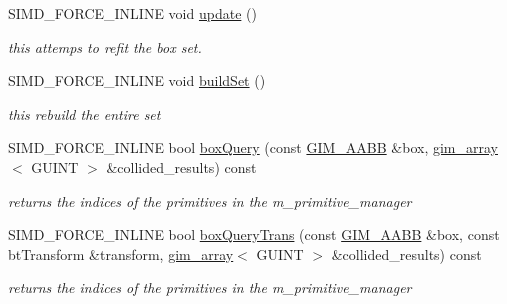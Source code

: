 \textbf{ }\par
\begin{DoxyCompactItemize}
\item 
S\+I\+M\+D\+\_\+\+F\+O\+R\+C\+E\+\_\+\+I\+N\+L\+I\+NE void \hyperlink{classGIM__BOX__TREE__TEMPLATE__SET_a0f5f2b683e561a4e05d912cb4973dac4}{update} ()
\begin{DoxyCompactList}\small\item\em this attemps to refit the box set. \end{DoxyCompactList}\item 
\mbox{\label{classGIM__BOX__TREE__TEMPLATE__SET_aada2fc55c2e11a4aa5c3ae0c852f4950}} 
S\+I\+M\+D\+\_\+\+F\+O\+R\+C\+E\+\_\+\+I\+N\+L\+I\+NE void \hyperlink{classGIM__BOX__TREE__TEMPLATE__SET_aada2fc55c2e11a4aa5c3ae0c852f4950}{build\+Set} ()
\begin{DoxyCompactList}\small\item\em this rebuild the entire set \end{DoxyCompactList}\item 
\mbox{\label{classGIM__BOX__TREE__TEMPLATE__SET_a275f0e8b4133140f4a53012df5a1aada}} 
S\+I\+M\+D\+\_\+\+F\+O\+R\+C\+E\+\_\+\+I\+N\+L\+I\+NE bool \hyperlink{classGIM__BOX__TREE__TEMPLATE__SET_a275f0e8b4133140f4a53012df5a1aada}{box\+Query} (const \hyperlink{classGIM__AABB}{G\+I\+M\+\_\+\+A\+A\+BB} \&box, \hyperlink{classgim__array}{gim\+\_\+array}$<$ G\+U\+I\+NT $>$ \&collided\+\_\+results) const
\begin{DoxyCompactList}\small\item\em returns the indices of the primitives in the m\+\_\+primitive\+\_\+manager \end{DoxyCompactList}\item 
\mbox{\label{classGIM__BOX__TREE__TEMPLATE__SET_a7bbe0306a940c9027362af374ac95c5e}} 
S\+I\+M\+D\+\_\+\+F\+O\+R\+C\+E\+\_\+\+I\+N\+L\+I\+NE bool \hyperlink{classGIM__BOX__TREE__TEMPLATE__SET_a7bbe0306a940c9027362af374ac95c5e}{box\+Query\+Trans} (const \hyperlink{classGIM__AABB}{G\+I\+M\+\_\+\+A\+A\+BB} \&box, const bt\+Transform \&transform, \hyperlink{classgim__array}{gim\+\_\+array}$<$ G\+U\+I\+NT $>$ \&collided\+\_\+results) const
\begin{DoxyCompactList}\small\item\em returns the indices of the primitives in the m\+\_\+primitive\+\_\+manager \end{DoxyCompactList}\item 

\end{DoxyCompactItemize}
